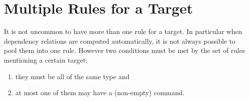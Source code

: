\documentclass[12pt]{article}
\begin{document}





\section{Multiple Rules for a Target}
\label{secMultipleRules}

It is not uncommon to have more than one rule for a target. In
particular when dependency relations are computed automatically, it is
not always possible to pool them into one rule. However two conditions
must be met by the set of rules mentioning a certain target:

\begin{enumerate}
\item they must be all of the same type and
\item at most one of them may have a (non-empty) command.
\end{enumerate}
\end{document}
